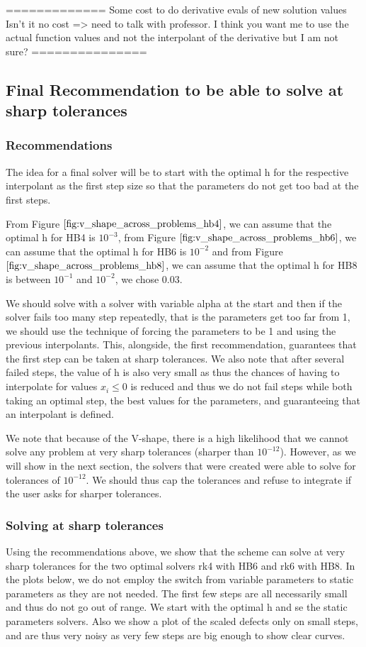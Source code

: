 \documentclass{article}
\begin{document}
	
=============
Some cost to do derivative evals of new solution values
Isn't it no cost => need to talk with professor.
I think you want me to use the actual function values and not the interpolant of the derivative but I am not sure?
===============

\subsection{Final Recommendation to be able to solve at sharp tolerances}
\label{section:HBs_higher_tol}
\subsubsection{Recommendations}
The idea for a final solver will be to start with the optimal h for the respective interpolant as the first step size so that the parameters do not get too bad at the first steps.

From Figure $\ref{fig:v_shape_across_problems_hb4}$, we can assume that the optimal h for HB4 is $10^{-3}$, from Figure $\ref{fig:v_shape_across_problems_hb6}$, we can assume that the optimal h for HB6 is $10^{-2}$ and from Figure $\ref{fig:v_shape_across_problems_hb8}$, we can assume that the optimal h for HB8 is between $10^{-1}$ and $10^{-2}$, we chose $0.03$.

We should solve with a solver with variable alpha at the start and then if the solver fails too many step repeatedly, that is the parameters get too far from 1, we should use the technique of forcing the parameters to be 1 and using the previous interpolants. This, alongside, the first recommendation, guarantees that the first step can be taken at sharp tolerances. We also note that after several failed steps, the value of h is also very small as thus the chances of having to interpolate for values $x_i \leq 0$ is reduced and thus we do not fail steps while both taking an optimal step, the best values for the parameters, and guaranteeing that an interpolant is defined. 

We note that because of the V-shape, there is a high likelihood that we cannot solve any problem at very sharp tolerances (sharper than $10^{-12}$). However, as we will show in the next section, the solvers that were created were able to solve for tolerances of $10^{-12}$. We should thus cap the tolerances and refuse to integrate if the user asks for sharper tolerances.

\subsubsection{Solving at sharp tolerances}
Using the recommendations above, we show that the scheme can solve at very sharp tolerances for the two optimal solvers rk4 with HB6 and rk6 with HB8. In the plots below, we do not employ the switch from variable parameters to static parameters as they are not needed. The first few steps are all necessarily small and thus do not go out of range. We start with the optimal h and se the static parameters solvers. Also we show a plot of the scaled defects only on small steps, and are thus very noisy as very few steps are big enough to show clear curves.
\end{document}
